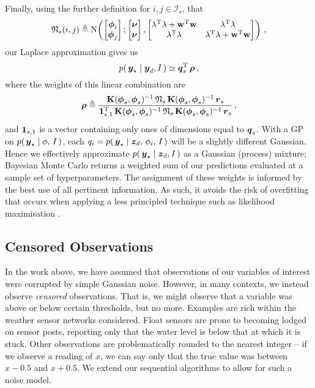 \documentclass{acmtrans2m}
\begin{document}
Finally, using the further definition for $i,j \in \mathcal{I}_s$, that
\begin{equation}
\mathbf{\mathfrak{N}}_s(i,j) \triangleq \text{N}\!\left(\begin{bmatrix} \boldsymbol{\phi}_i \\ \boldsymbol{\phi}_j \end{bmatrix};\begin{bmatrix} \boldsymbol{\nu} \\ \boldsymbol{\nu} \end{bmatrix},\begin{bmatrix}  \mathbf{\lambda}^{\mathrm{T}} \mathbf{\lambda}+\mathbf{w}^{\mathrm{T}} \mathbf{w} & \mathbf{\lambda}^{\mathrm{T}} \mathbf{\lambda} \\ \mathbf{\lambda}^{\mathrm{T}} \mathbf{\lambda} & \mathbf{\lambda}^{\mathrm{T}} \mathbf{\lambda}+\mathbf{w}^{\mathrm{T}} \mathbf{w}
\end{bmatrix}\right)\,,
\end{equation}
our Laplace approximation gives us
\begin{equation} \label{eq:muPsi}
p\!\left(\,\boldsymbol{y}_\star\mid\boldsymbol{y}_d,I\,\right) \simeq \boldsymbol{q}_s^{\mathrm{T}}\,\boldsymbol{\rho}\,,
\end{equation}
where the weights of this linear combination are
\begin{equation}
\boldsymbol{\rho}\triangleq\frac{\mathbf{K}(\boldsymbol{\phi}_s,\boldsymbol{\phi}_s)^{-1}\,\mathbf{\mathfrak{N}}_s\,\mathbf{K}(\boldsymbol{\phi}_s,\boldsymbol{\phi}_s)^{-1}\,\boldsymbol{r}_s}
{\mathbf{1}_{s,1}^{\mathrm{T}}\,\mathbf{K}(\boldsymbol{\phi}_s,\boldsymbol{\phi}_s)^{-1}\,\mathbf{\mathfrak{N}}_s\,\mathbf{K}(\boldsymbol{\phi}_s,\boldsymbol{\phi}_s)^{-1}\,\boldsymbol{r}_s}\,,
\end{equation}
and $\mathbf{1}_{s,1}$ is a vector containing only ones of dimensions equal to $\boldsymbol{q}_s$. With a GP on 
$p\!\left(\,\boldsymbol{y}_\star\mid\phi,\,I\,\right)$, each $q_i = p\!\left(\,\boldsymbol{y}_\star\mid\boldsymbol{z}_d,\,\phi_i,\,I\,\right)$ will be a slightly different Gaussian. Hence we effectively approximate $p\!\left(\,\boldsymbol{y}_\star\mid\boldsymbol{z}_d,I\,\right)$ as a Gaussian (process) mixture; Bayesian Monte Carlo returns a weighted sum of our predictions evaluated at a sample set of hyperparameters. The assignment of these weights is informed by the best use of all pertinent information. As such, it avoids the risk of overfitting that occurs when applying a less principled technique such as likelihood maximisation \cite{MKBook}.

\subsection{Censored Observations}

In the work above, we have assumed that observations of our variables of interest were corrupted by simple Gaussian noise. However, in many contexts, we instead observe \emph{censored} observations. That is, we might observe that a variable was above or below certain thresholds, but no more. Examples are rich within the weather sensor networks considered. Float sensors are prone to becoming lodged on sensor posts, reporting only that the water level is below that at which it is stuck. Other observations are problematically rounded to the nearest integer -- if we observe a reading of $x$, we can say only that the true value was between $x-0.5$ and $x+0.5$. We extend our sequential algorithms to allow for such a noise model. 
\end{document}
